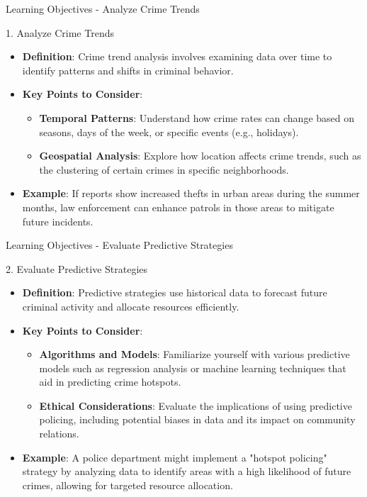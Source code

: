 \documentclass[aspectratio=169]{beamer}
\begin{document}
\begin{frame}[fragile]{Learning Objectives - Analyze Crime Trends}
    \begin{block}{1. Analyze Crime Trends}
        \begin{itemize}
            \item \textbf{Definition}: Crime trend analysis involves examining data over time to identify patterns and shifts in criminal behavior.
            \item \textbf{Key Points to Consider}:
            \begin{itemize}
                \item \textbf{Temporal Patterns}: Understand how crime rates can change based on seasons, days of the week, or specific events (e.g., holidays).
                \item \textbf{Geospatial Analysis}: Explore how location affects crime trends, such as the clustering of certain crimes in specific neighborhoods.
            \end{itemize}
            \item \textbf{Example}: If reports show increased thefts in urban areas during the summer months, law enforcement can enhance patrols in those areas to mitigate future incidents.
        \end{itemize}
    \end{block}
\end{frame}

\begin{frame}[fragile]{Learning Objectives - Evaluate Predictive Strategies}
    \begin{block}{2. Evaluate Predictive Strategies}
        \begin{itemize}
            \item \textbf{Definition}: Predictive strategies use historical data to forecast future criminal activity and allocate resources efficiently.
            \item \textbf{Key Points to Consider}:
            \begin{itemize}
                \item \textbf{Algorithms and Models}: Familiarize yourself with various predictive models such as regression analysis or machine learning techniques that aid in predicting crime hotspots.
                \item \textbf{Ethical Considerations}: Evaluate the implications of using predictive policing, including potential biases in data and its impact on community relations.
            \end{itemize}
            \item \textbf{Example}: A police department might implement a "hotspot policing" strategy by analyzing data to identify areas with a high likelihood of future crimes, allowing for targeted resource allocation.
        \end{itemize}
    \end{block}
\end{frame}
\end{document}
